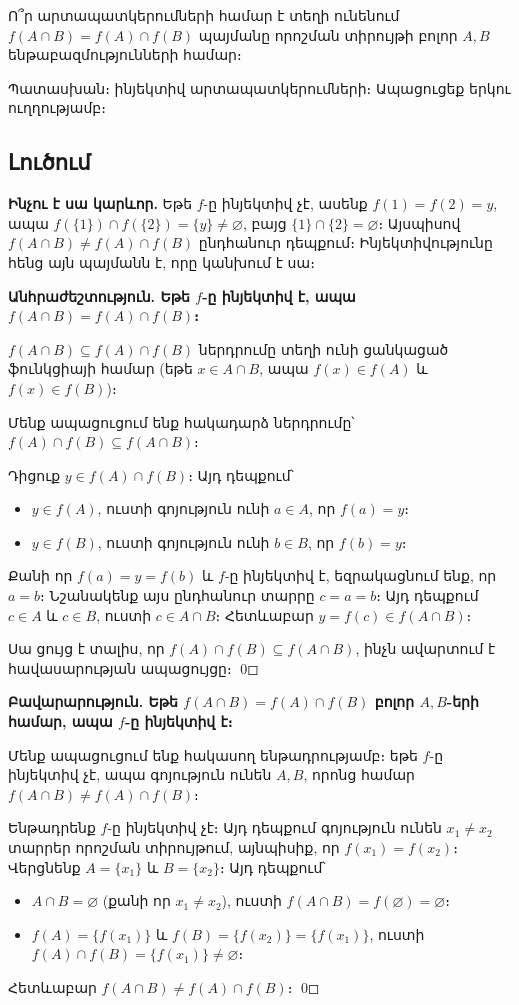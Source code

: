 \documentclass[12pt, a4paper]{article}
\begin{document}
\begin{problembox}
Ո՞ր արտապատկերումների համար է տեղի ունենում $f(A \cap B) = f(A) \cap f(B)$ պայմանը որոշման տիրույթի բոլոր $A, B$ ենթաբազմությունների համար։

Պատասխան։ ինյեկտիվ արտապատկերումների։ Ապացուցեք երկու ուղղությամբ։
\end{problembox}

\subsection*{Լուծում}

\textbf{Ինչու է սա կարևոր.}\; Եթե $f$-ը ինյեկտիվ չէ, ասենք $f(1) = f(2) = y$, ապա $f(\{1\}) \cap f(\{2\}) = \{y\} \neq \varnothing$, բայց $\{1\} \cap \{2\} = \varnothing$։ Այսպիսով $f(A \cap B) \neq f(A) \cap f(B)$ ընդհանուր դեպքում։ Ինյեկտիվությունը հենց այն պայմանն է, որը կանխում է սա։

\medskip

\textbf{Անհրաժեշտություն. Եթե $f$-ը ինյեկտիվ է, ապա $f(A \cap B) = f(A) \cap f(B)$։}

$f(A \cap B) \subseteq f(A) \cap f(B)$ ներդրումը տեղի ունի ցանկացած ֆունկցիայի համար (եթե $x \in A \cap B$, ապա $f(x) \in f(A)$ և $f(x) \in f(B)$)։

Մենք ապացուցում ենք հակադարձ ներդրումը՝ $f(A) \cap f(B) \subseteq f(A \cap B)$։

Դիցուք $y \in f(A) \cap f(B)$։ Այդ դեպքում՝
\begin{itemize}[nosep]
  \item $y \in f(A)$, ուստի գոյություն ունի $a \in A$, որ $f(a) = y$։
  \item $y \in f(B)$, ուստի գոյություն ունի $b \in B$, որ $f(b) = y$։
\end{itemize}
Քանի որ $f(a) = y = f(b)$ և $f$-ը ինյեկտիվ է, եզրակացնում ենք, որ $a = b$։
Նշանակենք այս ընդհանուր տարրը $c = a = b$։ Այդ դեպքում $c \in A$ և $c \in B$, ուստի $c \in A \cap B$։
Հետևաբար $y = f(c) \in f(A \cap B)$։

Սա ցույց է տալիս, որ $f(A) \cap f(B) \subseteq f(A \cap B)$, ինչն ավարտում է հավասարության ապացույցը։ \qed

\bigskip
\textbf{Բավարարություն. Եթե $f(A \cap B) = f(A) \cap f(B)$ բոլոր $A, B$-երի համար, ապա $f$-ը ինյեկտիվ է։}

Մենք ապացուցում ենք հակասող ենթադրությամբ։ եթե $f$-ը ինյեկտիվ չէ, ապա գոյություն ունեն $A, B$, որոնց համար $f(A \cap B) \neq f(A) \cap f(B)$։

Ենթադրենք $f$-ը ինյեկտիվ չէ։ Այդ դեպքում գոյություն ունեն $x_1 \neq x_2$ տարրեր որոշման տիրույթում, այնպիսիք, որ $f(x_1) = f(x_2)$։
Վերցնենք $A = \{x_1\}$ և $B = \{x_2\}$։ Այդ դեպքում՝
\begin{itemize}[nosep]
  \item $A \cap B = \varnothing$ (քանի որ $x_1 \neq x_2$), ուստի $f(A \cap B) = f(\varnothing) = \varnothing$։
  \item $f(A) = \{f(x_1)\}$ և $f(B) = \{f(x_2)\} = \{f(x_1)\}$,
        ուստի $f(A) \cap f(B) = \{f(x_1)\} \neq \varnothing$։
\end{itemize}
Հետևաբար $f(A \cap B) \neq f(A) \cap f(B)$։ \qed
\end{document}
